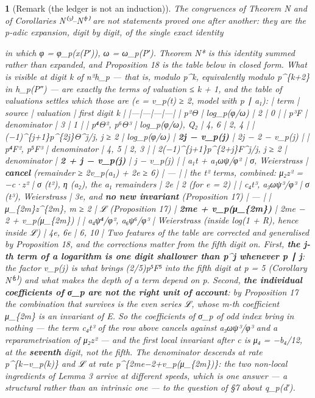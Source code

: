 \documentclass[11pt,a4paper]{article}
\theoremstyle{named}
\newtheorem*{namedthm}{}
\newcommand{\dispf}[1]{\par\smallskip{\centering #1\par}\smallskip}
\begin{document}
\begin{namedthm}[Remark (the ledger is not an induction)]
The congruences of Theorem N and of Corollaries N⁽³⁾–N⁽⁷⁾ are not statements proved one after another: they are the p-adic expansion, digit by digit, of the single exact identity
\dispf{\textbf{p²·n²h\_p(P) = h\_p(P″) = 2 log\_p(σ\_p(t)/t) + 2 log\_p(φ/ω) − 2p²·log\_p(d′)},  t = t(P″),}
in which φ = φ\_p(x(P′)), ω = ω\_p(P′). Theorem N* is this identity summed rather than expanded, and Proposition 18 is the table below in closed form. What is visible at digit k of n²h\_p — that is, modulo p\textasciicircum{}k, equivalently modulo p\textasciicircum{}\{k+2\} in h\_p(P″) — are exactly the terms of valuation ≤ k + 1, and the table of valuations settles which those are (e = v\_p(t) ≥ 2, model with p ∣ a₁):
| term | source | valuation | first digit k | |---|---|---|---| | p²Θ | log\_p(φ/ω) | 2 | 0 | | p³F | denominator | 3 | 1 | | p⁴Θ², p⁶Θ³ | log\_p(φ/ω), Q₂ | 4, 6 | 2, 4 | | (−1)\textasciicircum{}\{j+1\}p\textasciicircum{}\{2j\}Θ\textasciicircum{}j/j, j ≥ 2 | log\_p(φ/ω) | \textbf{2j − v\_p(j)} | 2j − 2 − v\_p(j) | | p⁴F², p⁵F³ | denominator | 4, 5 | 2, 3 | | 2(−1)\textasciicircum{}\{j+1\}p\textasciicircum{}\{2+j\}F\textasciicircum{}j/j, j ≥ 2 | denominator | \textbf{2 + j − v\_p(j)} | j − v\_p(j) | | a₁t + a₁ωψ/φ² | σ, Weierstrass | \textbf{cancel} (remainder ≥ 2v\_p(a₁) + 2e ≥ 6) | — | | the t² terms, combined: μ₂z² = −c·z² | σ (t²), η (a₂), the a₁ remainders | 2e | 2 (for e = 2) | | c₄t³, a₃ωψ³/φ³ | σ (t³), Weierstrass | 3e, and \textbf{no new invariant} (Proposition 17) | — | | μ\_\{2m\}z\textasciicircum{}\{2m\}, m ≥ 2 | ℒ (Proposition 17) | \textbf{2me + v\_p(μ\_\{2m\})} | 2me − 2 + v\_p(μ\_\{2m\}) | | a₄ψ⁴/φ², a₆ψ⁶/φ³ | Weierstrass (inside log(1 + R), hence inside ℒ) | 4e, 6e | 6, 10 |
Two features of the table are corrected and generalised by Proposition 18, and the corrections matter from the fifth digit on. First, \textbf{the j-th term of a logarithm is one digit shallower than p\textasciicircum{}j whenever p ∣ j}: the factor v\_p(j) is what brings (2/5)p⁵F⁵ into the fifth digit at p = 5 (Corollary N⁽⁵⁾) and what makes the depth of a term depend on p. Second, \textbf{the individual coefficients of σ\_p are not the right unit of account}: by Proposition 17 the combination that survives is the even series ℒ, whose m-th coefficient μ\_\{2m\} is an invariant of E. So the coefficients of σ\_p of odd index bring in nothing — the term c₄t³ of the row above cancels against a₃ωψ³/φ³ and a reparametrisation of μ₂z² — and the first local invariant after c is μ₄ = −b₄/12, at the \textbf{seventh} digit, not the fifth. The denominator descends at rate p\textasciicircum{}\{k−v\_p(k)\} and ℒ at rate p\textasciicircum{}\{2me−2+v\_p(μ\_\{2m\})\}: the two non-local ingredients of Lemma 3 arrive at different speeds, which is one answer — a structural rather than an intrinsic one — to the question of §7 about q\_p(d′).
\end{namedthm}
\end{document}
